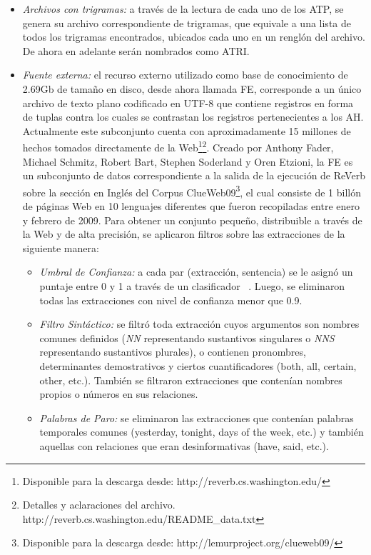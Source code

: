 \begin{itemize}
\item	\emph{Archivos con trigramas:} a trav\'es de la lectura de cada uno de los ATP, se genera su archivo correspondiente de trigramas, que equivale a una lista de todos los trigramas encontrados, ubicados cada uno en un rengl\'on del archivo. De ahora en adelante ser\'an nombrados como ATRI.

\item	\emph{Fuente externa:} el recurso externo utilizado como base de conocimiento de 2.69Gb de tama\~no en disco, desde ahora llamada FE, corresponde a un \'unico archivo de texto plano codificado en UTF-8 que contiene registros en forma de tuplas contra los cuales se contrastan los registros pertenecientes a los AH.
Actualmente este subconjunto cuenta con aproximadamente 15 millones de hechos tomados directamente de la Web\footnote{Disponible para la descarga desde: http://reverb.cs.washington.edu/}\footnote{Detalles y aclaraciones del archivo.  http://reverb.cs.washington.edu/README\_data.txt}.
Creado por Anthony Fader, Michael Schmitz, Robert Bart, Stephen Soderland y Oren Etzioni, la FE es un subconjunto de datos correspondiente a la salida de la ejecuci\'on de ReVerb sobre la secci\'on en Ingl\'es del Corpus ClueWeb09\footnote{Disponible para la descarga desde: http://lemurproject.org/clueweb09/}, el cual consiste de 1 bill\'on de p\'aginas Web en 10 lenguajes diferentes que fueron recopiladas entre enero y febrero de 2009.
Para obtener un conjunto peque\~no, distribuible a trav\'es de la Web y de alta precisi\'on, se aplicaron filtros sobre las extracciones de la siguiente manera:

\begin{itemize}
\item	\emph{Umbral de Confianza:} a cada par (extracci\'on, sentencia) se le asign\'o un puntaje entre 0 y 1 a trav\'es de un clasificador ~\cite{AnStOr:11}. Luego, se eliminaron todas las extracciones con nivel de confianza menor que 0.9.

\item	\emph{Filtro Sint\'actico:} se filtr\'o toda extracci\'on cuyos argumentos son nombres comunes definidos (\emph{NN} representando sustantivos singulares o \emph{NNS} representando sustantivos plurales), o contienen pronombres, determinantes demostrativos y ciertos cuantificadores (both, all, certain, other, etc.). Tambi\'en se filtraron extracciones que conten\'ian nombres propios o n\'umeros en sus relaciones.

\item	\emph{Palabras de Paro:} se eliminaron las extracciones que conten\'ian palabras temporales comunes (yesterday, tonight, days of the week, etc.) y tambi\'en aquellas con relaciones que eran desinformativas (have, said, etc.).


\end{itemize}
\end{itemize}
